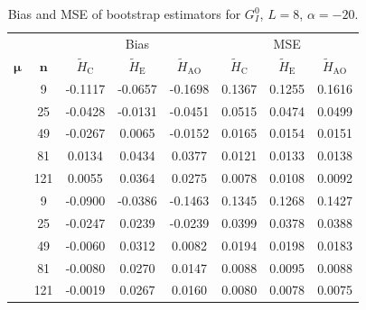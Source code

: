 \documentclass[conference,final,]{IEEEtran}
\begin{document}
\begin{table}

\caption{\label{tab:table2}Bias and MSE of bootstrap estimators for $G_I^0$, $L=8$, $\alpha=-20$.}
\centering
\begin{tabular}[t]{cccccccc}
\toprule
\multicolumn{1}{c}{ } & \multicolumn{1}{c}{ } & \multicolumn{3}{c}{Bias} & \multicolumn{3}{c}{MSE} \\
\cmidrule(l{3pt}r{3pt}){3-5} \cmidrule(l{3pt}r{3pt}){6-8}
$\bm{\mu}$ & $\bm{n}$ & $\widetilde{H}_{\text{C}}$ & $\widetilde{H}_{\text{E}}$ & $\widetilde{H}_{\text{AO}}$ & $\widetilde{H}_{\text{C}}$ & $\widetilde{H}_{\text{E}}$ & $\widetilde{H}_{\text{AO}}$\\
\midrule
 & 9 & -0.1117 & -0.0657 & -0.1698 & 0.1367 & 0.1255 & 0.1616\\

 & 25 & -0.0428 & -0.0131 & -0.0451 & 0.0515 & 0.0474 & 0.0499\\

 & 49 & -0.0267 & 0.0065 & -0.0152 & 0.0165 & 0.0154 & 0.0151\\

 & 81 & 0.0134 & 0.0434 & 0.0377 & 0.0121 & 0.0133 & 0.0138\\

\multirow{-5}{*}{\centering\arraybackslash 1} & 121 & 0.0055 & 0.0364 & 0.0275 & 0.0078 & 0.0108 & 0.0092\\
\cmidrule{1-8}
 & 9 & -0.0900 & -0.0386 & -0.1463 & 0.1345 & 0.1268 & 0.1427\\

 & 25 & -0.0247 & 0.0239 & -0.0239 & 0.0399 & 0.0378 & 0.0388\\

 & 49 & -0.0060 & 0.0312 & 0.0082 & 0.0194 & 0.0198 & 0.0183\\

 & 81 & -0.0080 & 0.0270 & 0.0147 & 0.0088 & 0.0095 & 0.0088\\

\multirow{-5}{*}{\centering\arraybackslash 10} & 121 & -0.0019 & 0.0267 & 0.0160 & 0.0080 & 0.0078 & 0.0075\\
\bottomrule
\end{tabular}
\end{table}
\end{document}
